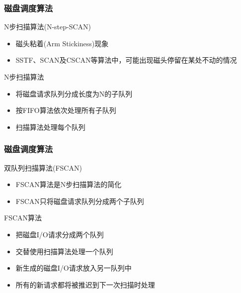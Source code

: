 \begin{frame}[fragile]
    \frametitle{磁盘调度算法}
    N步扫描算法(N-step-SCAN)
    \begin{itemize}
        \item 磁头粘着(Arm Stickiness)现象
        \item SSTF、SCAN及CSCAN等算法中，可能出现磁头停留在某处不动的情况
    \end{itemize}
    N步扫描算法
    \begin{itemize}
        \item 将磁盘请求队列分成长度为N的子队列
        \item 按FIFO算法依次处理所有子队列
        \item 扫描算法处理每个队列        
    \end{itemize}
\end{frame}

\begin{frame}[fragile]
    \frametitle{磁盘调度算法}
    双队列扫描算法(FSCAN)
    \begin{itemize}
        \item FSCAN算法是N步扫描算法的简化
        \item FSCAN只将磁盘请求队列分成两个子队列
    \end{itemize}
    FSCAN算法
    \begin{itemize}
        \item 把磁盘I/O请求分成两个队列
        \item 交替使用扫描算法处理一个队列
        \item 新生成的磁盘I/O请求放入另一队列中
        \item 所有的新请求都将被推迟到下一次扫描时处理        
    \end{itemize}
\end{frame}

